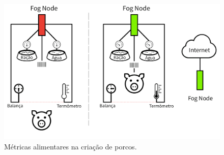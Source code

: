 \begin{figure}[H]
    \centering\includegraphics[width=.8\textwidth]{fig17.png} 
    \caption[ Métricas alimentares na criação de porcos]
    {\label{fig:fig17} Métricas alimentares na criação de porcos.}
\end{figure}
